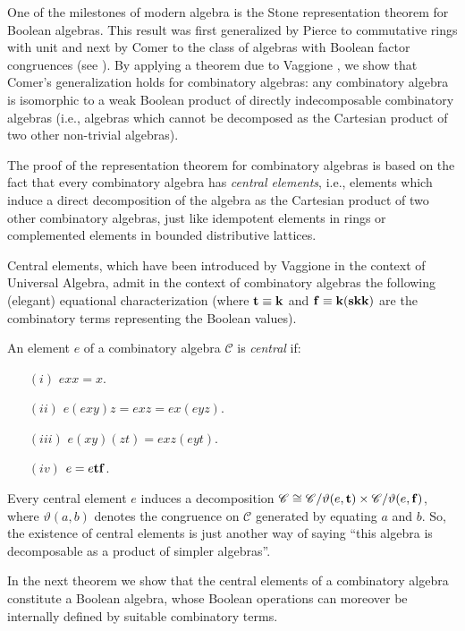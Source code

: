 \documentclass[english]{llncs}
\newcommand{\alg}[1]{\mathscr{#1}} \newcommand{\CE}[1]{{\mathrm{CE}(#1)}} \newcommand{\IE}[1]{{\mathrm{IE}(#1)}} \newcommand{\class}[1]{\mathbb{#1}}
\newcommand{\gth}{\vartheta}
\newcommand\ssk{{\bf k}}
\newcommand\sst{{\bf t}}
\newcommand\ssf{{\bf f}}
\newcommand\sss{{\bf s}}
\begin{document}
One of the milestones of modern algebra is the Stone representation theorem for Boolean algebras.
This result was first generalized by Pierce to commutative rings with unit and next by Comer to the class of algebras with Boolean factor 
congruences (see \cite{Comer71,Johnstone82,Pierce67}). 
By applying a theorem due to Vaggione \cite{Vaggione96b}, we show that Comer's generalization holds for combinatory algebras: 
any combinatory algebra is isomorphic to a weak Boolean product of directly indecomposable combinatory algebras 
(i.e., algebras which cannot be decomposed as the Cartesian product of two other non-trivial algebras). 

The proof of the representation theorem for combinatory algebras is based on the fact that every combinatory algebra has 
{\em central elements}, i.e., elements which induce a direct decomposition of the algebra as the Cartesian product of two 
other combinatory algebras, just like idempotent elements in rings or complemented elements in bounded distributive lattices.

Central elements, which have been introduced by Vaggione \cite{Vaggione96a} in the context of Universal Algebra, admit in the 
context of combinatory algebras the following (elegant) equational characterization (where $\sst \equiv \ssk$ and 
$\ssf \equiv \ssk(\sss\ssk\ssk)$ are the combinatory terms representing the Boolean values).

\begin{definition} An element $e$ of a combinatory algebra $\alg{C}$ is {\em central} if:
\begin{enumerate}
\item[$(i)$] $exx = x$.
\item[$(ii)$] $e(exy)z = exz = ex(eyz)$.
\item[$(iii)$] $e(xy)(zt) = exz(eyt)$.
\item[$(iv)$] $e = e\sst\ssf$.
\end{enumerate}
\end{definition}

Every central element $e$ induces a decomposition $\alg{C}\cong \alg{C}/\gth(e,\sst)\times\alg{C}/\gth(e,\ssf)$, where 
$\gth(a,b)$ denotes the congruence on $\alg{C}$ generated by equating $a$ and $b$.
So, the existence of central elements is just another way of saying ``this algebra is decomposable as a product of simpler algebras''.

In the next theorem we show that the central elements of a combinatory algebra constitute a Boolean algebra, whose Boolean operations
can moreover be internally defined by suitable combinatory terms. 
\end{document}
